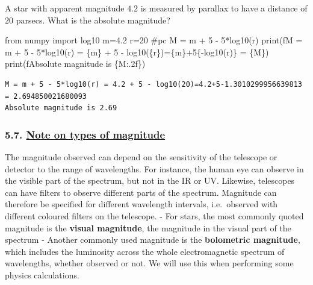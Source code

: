 \documentclass[
  letterpaper,
  DIV=11,
  numbers=noendperiod]{scrartcl}
\newenvironment{Shaded}{\begin{snugshade}}{\end{snugshade}}
\newcommand{\BuiltInTok}[1]{\textcolor[rgb]{0.00,0.23,0.31}{#1}}
\newcommand{\CommentTok}[1]{\textcolor[rgb]{0.37,0.37,0.37}{#1}}
\newcommand{\DecValTok}[1]{\textcolor[rgb]{0.68,0.00,0.00}{#1}}
\newcommand{\FloatTok}[1]{\textcolor[rgb]{0.68,0.00,0.00}{#1}}
\newcommand{\ImportTok}[1]{\textcolor[rgb]{0.00,0.46,0.62}{#1}}
\newcommand{\NormalTok}[1]{\textcolor[rgb]{0.00,0.23,0.31}{#1}}
\newcommand{\OperatorTok}[1]{\textcolor[rgb]{0.37,0.37,0.37}{#1}}
\newcommand{\SpecialCharTok}[1]{\textcolor[rgb]{0.37,0.37,0.37}{#1}}
\newcommand{\SpecialStringTok}[1]{\textcolor[rgb]{0.13,0.47,0.30}{#1}}
\begin{document}
A star with apparent magnitude \(4.2\) is measured by parallax to have a
distance of \(20\) parsecs. What is the absolute magnitude?

\begin{Shaded}
\begin{Highlighting}[]
\ImportTok{from}\NormalTok{ numpy }\ImportTok{import}\NormalTok{ log10}
\NormalTok{m}\OperatorTok{=}\FloatTok{4.2}
\NormalTok{r}\OperatorTok{=}\DecValTok{20} \CommentTok{\#pc}
\NormalTok{M }\OperatorTok{=}\NormalTok{ m }\OperatorTok{+} \DecValTok{5} \OperatorTok{{-}} \DecValTok{5}\OperatorTok{*}\NormalTok{log10(r)}
\BuiltInTok{print}\NormalTok{(}\SpecialStringTok{f\textquotesingle{}M = m + 5 {-} 5*log10(r) = }\SpecialCharTok{\{}\NormalTok{m}\SpecialCharTok{\}}\SpecialStringTok{ + 5 {-} log10(}\SpecialCharTok{\{}\NormalTok{r}\SpecialCharTok{\}}\SpecialStringTok{)=}\SpecialCharTok{\{}\NormalTok{m}\SpecialCharTok{\}}\SpecialStringTok{+5}\SpecialCharTok{\{}\OperatorTok{{-}}\NormalTok{log10(r)}\SpecialCharTok{\}}\SpecialStringTok{ = }\SpecialCharTok{\{}\NormalTok{M}\SpecialCharTok{\}}\SpecialStringTok{\textquotesingle{}}\NormalTok{)}
\BuiltInTok{print}\NormalTok{(}\SpecialStringTok{f\textquotesingle{}Absolute magnitude is }\SpecialCharTok{\{}\NormalTok{M}\SpecialCharTok{:.2f\}}\SpecialStringTok{\textquotesingle{}}\NormalTok{)}
\end{Highlighting}
\end{Shaded}

\begin{verbatim}
M = m + 5 - 5*log10(r) = 4.2 + 5 - log10(20)=4.2+5-1.3010299956639813 = 2.694850021680093
Absolute magnitude is 2.69
\end{verbatim}

\hypertarget{note-on-types-of-magnitude}{%
\subsubsection{\texorpdfstring{5.7. \protect\hyperlink{toc0_}{Note on
types of
magnitude}}{5.7. Note on types of magnitude}}\label{note-on-types-of-magnitude}}

The magnitude observed can depend on the sensitivity of the telescope or
detector to the range of wavelengths. For instance, the human eye can
observe in the visible part of the spectrum, but not in the IR or UV.
Likewise, telescopes can have filters to observe different parts of the
spectrum. Magnitude can therefore be specified for different wavelength
intervals, i.e.~observed with different coloured filters on the
telescope. - For stars, the most commonly quoted magnitude is the
\textbf{visual magnitude}, the magnitude in the visual part of the
spectrum - Another commonly used magnitude is the \textbf{bolometric
magnitude}, which includes the luminosity across the whole
electromagnetic spectrum of wavelengths, whether observed or not. We
will use this when performing some physics calculations.
\end{document}
